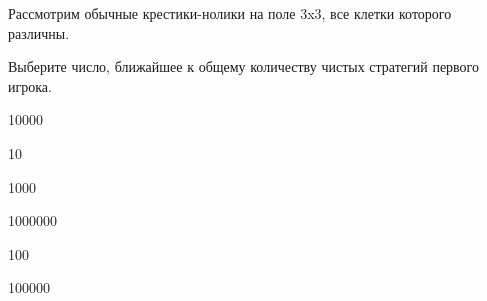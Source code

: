 
\begin{question}
Рассмотрим обычные крестики-нолики на поле 3x3, все клетки которого различны.

Выберите число, ближайшее к общему количеству чистых стратегий первого игрока.
\begin{answerlist}
  \item 10000
  \item 10
  \item 1000
  \item 1000000
  \item 100
  \item 100000
\end{answerlist}
\end{question}


